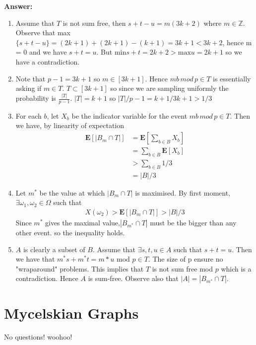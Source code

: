 \documentclass[12pt,a4paper]{report}
\newcounter{question}[chapter]
\newenvironment{answer}{%
  \par\noindent\textbf{Answer:}\ }%
{\par\vspace{1em}}
\begin{document}
\begin{answer}
  \begin{enumerate}
    \item Assume that $T$ is not sum free, then $s + t - u = m(3k+2)$ where $m \in \mathbb{Z}$. Observe that max$\{s + t - u\} = (2k+1) + (2k + 1)-(k+1) = 3k +1 < 3k+2$, hence m = 0 and we have $s + t = u$. But min${s+t} = 2k + 2 > \text{max}{u} = 2k+1$ so we have a contradiction. 
    \item Note that $p-1 = 3k+1$ so $m \in [3k +1]$. Hence $mb \, mod \, p \in T$ is essentially asking if $m \in T$. $T \subset [3k + 1]$ so since we are sampling uniformly the probability is $\frac{|T|}{p-1}$. $|T| = k + 1$ so $|T|/p-1 = k+1/3k + 1 > 1/3$
    \item For each $b$, let $X_b$ be the indicator variable for the event $mb \, mod \, p \in T$. Then we have, by linearity of expectation
    \begin{align*}
      \mathbf{E}[|B_m \cap T|] &= \mathbf{E}[\sum_{b \in B}X_b]\\
                               &= \sum_{b \in B} \mathbf{E}[X_b]\\
                               &> \sum_{b \in B} 1/3\\
                               &= |B|/3
    \end{align*}
    \item Let $m^*$ be the value at which $|B_m \cap T|$ is maximised. By first moment, $\exists \omega_1, \omega_2 \in \Omega$ such that 
    \begin{align*}
      X(\omega_2) > \mathbf{E}[|B_m \cap T|] > |B|/3
    \end{align*}
    Since $m^*$ gives the maximal value,$|B_{m^*} \cap T|$ must be the bigger than any other event. so the inequality holds.
    \item $A$ is clearly a subset of $B$. Assume that $\exists s, t, u \in A$ such that $s + t = u$. Then we have that $m^*s + m^*t = m*u$ mod $p \in T$. The size of p ensure no "wraparound" problems. This implies that $T$ is not sum free mod $p$ which is a contradiction. Hence $A$ is sum-free. Observe also that $|A| = |B_{m^*} \cap T|$. 
  \end{enumerate}
\end{answer}


\section{Mycelskian Graphs}
No questions! woohoo!
\end{document}
